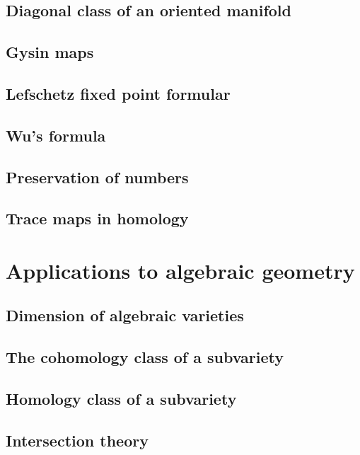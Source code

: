\documentclass[5pt]{article}
\theoremstyle{definition}
\theoremstyle{remark}
\begin{document}
	\subsection{Diagonal class of an oriented manifold}
	
	\subsection{Gysin maps}
	
	\subsection{Lefschetz fixed point formular}
	
	\subsection{Wu's formula}
	
	\subsection{Preservation of numbers}
	
	\subsection{Trace maps in homology}
	
	\newpage
	
	\section{Applications to algebraic geometry}
	
	\subsection{Dimension of algebraic varieties}
	
	\subsection{The cohomology class of a subvariety}
	
	\subsection{Homology class of a subvariety}
	
	\subsection{Intersection theory}
	
\end{document}
